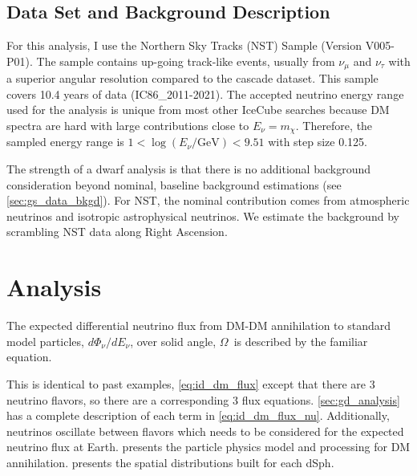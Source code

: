 \subsection{Data Set and Background Description} \label{sec:icDM_data_bkgd}

For this analysis, I use the Northern Sky Tracks (NST) Sample (Version V005-P01).
The sample contains up-going track-like events, usually from $\nu_\mu$ and $\nu_\tau$ with a superior angular resolution compared to the cascade dataset.
This sample covers 10.4 years of data (IC86\_2011-2021).
The accepted neutrino energy range used for the analysis is unique from most other IceCube searches because DM spectra are hard with large contributions close to $E_\nu = m_\chi$.
Therefore, the sampled energy range is $1 < \log(E_\nu /\textrm{GeV}) < 9.51$ with step size 0.125.

The strength of a dwarf analysis is that there is no additional background consideration beyond nominal, baseline background estimations (see \cref{sec:gs_data_bkgd}).
For NST, the nominal contribution comes from atmospheric neutrinos and isotropic astrophysical neutrinos.
We estimate the background by scrambling NST data along Right Ascension.

\section{Analysis}\label{sec:icDM_analysis}

The expected differential neutrino flux from DM-DM annihilation to standard model
particles, $d\Phi_{\nu}/dE_{\nu}$, over solid angle, $\Omega$~is described by the familiar equation.
\iddmannilationNu

This is identical to past examples, \cref{eq:id_dm_flux} except that there are 3 neutrino flavors, so there are a corresponding 3 flux equations.
\cref{sec:gd_analysis} has a complete description of each term in \cref{eq:id_dm_flux_nu}.
Additionally, neutrinos oscillate between flavors which needs to be considered for the expected neutrino flux at Earth.
 presents the particle physics model and processing for DM annihilation.
 presents the spatial distributions built for each dSph.

